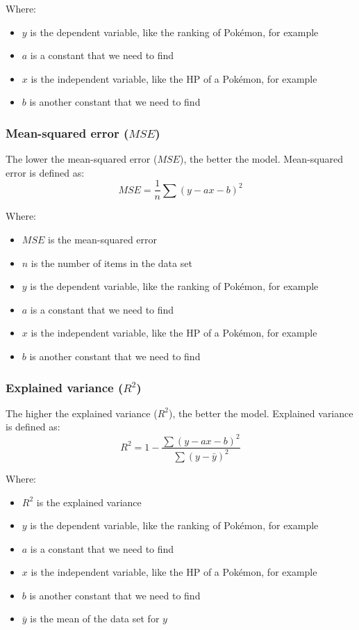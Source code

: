 \documentclass[11pt]{article}
\begin{document}
Where:
\begin{itemize}
\item \(y\) is the dependent variable, like the ranking of Pokémon, for example
\item \(a\) is a constant that we need to find
\item \(x\) is the independent variable, like the HP of a Pokémon, for example
\item \(b\) is another constant that we need to find
\end{itemize}
\subsubsection{Mean-squared error (\(MSE\))}
\label{sec:org0fcc3b5}
The lower the mean-squared error (\(MSE\)), the better the model. Mean-squared error is defined as:
\[MSE = \frac{1}{n} \sum (y - ax - b)^2\]

Where:
\begin{itemize}
\item \(MSE\) is the mean-squared error
\item \(n\) is the number of items in the data set
\item \(y\) is the dependent variable, like the ranking of Pokémon, for example
\item \(a\) is a constant that we need to find
\item \(x\) is the independent variable, like the HP of a Pokémon, for example
\item \(b\) is another constant that we need to find
\end{itemize}

 \newpage
\subsubsection{Explained variance (\(R^2\))}
\label{sec:orgc7ec5f4}
The higher the explained variance (\(R^2\)), the better the model. Explained variance is defined as:
\[R^2 = 1 - \frac{\sum (y - ax - b)^2}{\sum(y - \bar{y})^2}\]

Where:
\begin{itemize}
\item \(R^2\) is the explained variance
\item \(y\) is the dependent variable, like the ranking of Pokémon, for example
\item \(a\) is a constant that we need to find
\item \(x\) is the independent variable, like the HP of a Pokémon, for example
\item \(b\) is another constant that we need to find
\item \(\bar{y}\) is the mean of the data set for \(y\)
\end{itemize}
\end{document}
